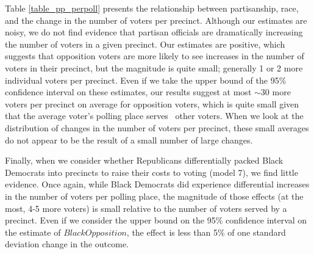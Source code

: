 \documentclass[12pt]{article}
\begin{document}
Table \ref{table_pp_perpoll} presents the relationship between partisanship, race, and the change in the number of voters per precinct.  Although our estimates are noisy, we do not find evidence that partisan officials are dramatically increasing the number of voters in a given precinct.  Our estimates are positive, which suggests that opposition voters are more likely to see increases in the number of voters in their precinct, but the magnitude is quite small; generally 1 or 2 more individual voters per precinct.  Even if we take the upper bound of the 95\% confidence interval on these estimates, our results suggest at most  $\sim 30$ more voters per precinct on average for opposition voters, which is quite small given that the average voter's polling place serves ~\unskip other voters.  When we look at the distribution of changes in the number of voters per precinct, these small averages do not appear to be the result of a small number of large changes.

Finally, when we consider whether Republicans differentially packed Black Democrats into precincts to raise their costs to voting (model 7), we find little evidence.  Once again, while Black Democrats did experience differential increases in the number of voters per polling place, the magnitude of those effects (at the most, 4-5 more voters) is small relative to the number of voters served by a precinct.  Even if we consider the upper bound on the 95\% confidence interval on the estimate of $BlackOpposition$, the effect is less than 5\% of one standard deviation change in the outcome.
\end{document}
